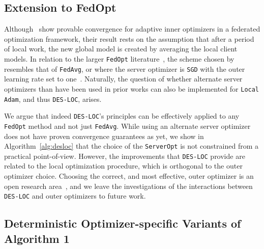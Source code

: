 \documentclass{article}
\begin{document}
\subsection{Extension to FedOpt}
\label{sec:fedopt}

Although~\citet{cheng2025convergence} show provable convergence for adaptive inner optimizers in a
federated optimization framework, their result rests on the assumption that after a period of local
work, the new global model is created by averaging the local client models. In relation to the larger
\texttt{FedOpt} literature~\citep{reddi2021adaptive}, the scheme chosen by~\citet{cheng2025convergence} resembles
that of \texttt{FedAvg}, or where the server optimizer is \texttt{SGD} with the outer learning rate set to one~\citep{reddi2021adaptive}.
Naturally, the question of whether alternate server optimizers than have been used in prior works
can also be implemented for \texttt{Local Adam}, and thus \texttt{DES-LOC}, arises.

We argue that indeed \texttt{DES-LOC}'s principles can be effectively applied to any \texttt{FedOpt} method and
not just \texttt{FedAvg}. While using an alternate server optimizer does not have proven convergence
guarantees as yet, we show in Algorithm~\ref{alg:desloc} that the choice of the \texttt{ServerOpt} is not constrained
from a practical point-of-view. However, the improvements that \texttt{DES-LOC} provide are related to
the local optimization procedure, which is orthogonal to the outer optimizer choice.
Choosing the correct, and most effective, outer optimizer is an open research area~\citep{khaled2025tuning},
and we leave the investigations of the interactions between \texttt{DES-LOC} and outer optimizers to future work.

\subsection{Deterministic Optimizer-specific Variants of Algorithm 1}
\label{sec:algorithm_variants}
\end{document}
